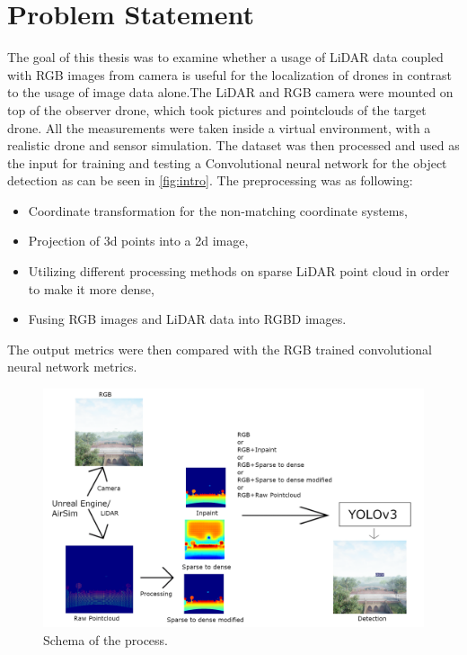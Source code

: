 \documentclass[twoside]{ctuthesis}
\theoremstyle{plain}
\theoremstyle{definition}
\theoremstyle{note}
\begin{document}
\section{Problem Statement}
The goal of this thesis was to examine whether a usage of LiDAR data coupled with RGB images from camera is useful for the localization of drones in contrast to the usage of image data alone.The LiDAR and RGB camera were mounted on top of the observer drone, which took pictures and pointclouds of the target drone. All the measurements were taken inside a virtual environment, with a realistic drone and sensor simulation. The dataset was then processed and used as the input for training and testing a Convolutional neural network for the object detection as can be seen in \autoref{fig:intro}. The preprocessing was as following:
\begin{itemize}
	\item Coordinate transformation for the non-matching coordinate systems,
	\item Projection of 3d points into a 2d image,
	\item Utilizing different processing methods on sparse LiDAR point cloud in order to make it more dense,
	\item Fusing RGB images and LiDAR data into RGBD images.
\end{itemize}
The output metrics were then compared with the RGB trained convolutional neural network metrics.
\begin{figure}
	\centering
	\includegraphics[width=\textwidth]{intro_schemav2.png}
	\caption{Schema of the process.}
	\label{fig:intro}
\end{figure}
\end{document}
